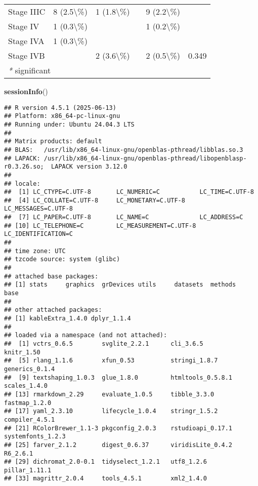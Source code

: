 \documentclass[
]{article}
\newenvironment{Shaded}{\begin{snugshade}}{\end{snugshade}}
\newcommand{\FunctionTok}[1]{\textcolor[rgb]{0.13,0.29,0.53}{\textbf{#1}}}
\newcommand{\NormalTok}[1]{#1}
\begin{document}
\begin{longtable}[t]{llllll}
\hspace{1em}Stage IIIC & 8 (2.5\textbackslash{}\%) & 1 (1.8\textbackslash{}\%) &  & 9 (2.2\textbackslash{}\%) & \\
\hspace{1em}Stage IV & 1 (0.3\textbackslash{}\%) &  &  & 1 (0.2\textbackslash{}\%) & \\
\hspace{1em}Stage IVA & 1 (0.3\textbackslash{}\%) &  &  &  & \\
\hspace{1em}Stage IVB &  & 2 (3.6\textbackslash{}\%) &  & 2 (0.5\textbackslash{}\%) & 0.349\\
\bottomrule
\multicolumn{6}{l}{\rule{0pt}{1em}\textit{*} significant}\\
\end{longtable}

\newpage

\begin{Shaded}
\begin{Highlighting}[]
\FunctionTok{sessionInfo}\NormalTok{()}
\end{Highlighting}
\end{Shaded}

\begin{verbatim}
## R version 4.5.1 (2025-06-13)
## Platform: x86_64-pc-linux-gnu
## Running under: Ubuntu 24.04.3 LTS
## 
## Matrix products: default
## BLAS:   /usr/lib/x86_64-linux-gnu/openblas-pthread/libblas.so.3 
## LAPACK: /usr/lib/x86_64-linux-gnu/openblas-pthread/libopenblasp-r0.3.26.so;  LAPACK version 3.12.0
## 
## locale:
##  [1] LC_CTYPE=C.UTF-8       LC_NUMERIC=C           LC_TIME=C.UTF-8       
##  [4] LC_COLLATE=C.UTF-8     LC_MONETARY=C.UTF-8    LC_MESSAGES=C.UTF-8   
##  [7] LC_PAPER=C.UTF-8       LC_NAME=C              LC_ADDRESS=C          
## [10] LC_TELEPHONE=C         LC_MEASUREMENT=C.UTF-8 LC_IDENTIFICATION=C   
## 
## time zone: UTC
## tzcode source: system (glibc)
## 
## attached base packages:
## [1] stats     graphics  grDevices utils     datasets  methods   base     
## 
## other attached packages:
## [1] kableExtra_1.4.0 dplyr_1.1.4     
## 
## loaded via a namespace (and not attached):
##  [1] vctrs_0.6.5        svglite_2.2.1      cli_3.6.5          knitr_1.50        
##  [5] rlang_1.1.6        xfun_0.53          stringi_1.8.7      generics_0.1.4    
##  [9] textshaping_1.0.3  glue_1.8.0         htmltools_0.5.8.1  scales_1.4.0      
## [13] rmarkdown_2.29     evaluate_1.0.5     tibble_3.3.0       fastmap_1.2.0     
## [17] yaml_2.3.10        lifecycle_1.0.4    stringr_1.5.2      compiler_4.5.1    
## [21] RColorBrewer_1.1-3 pkgconfig_2.0.3    rstudioapi_0.17.1  systemfonts_1.2.3 
## [25] farver_2.1.2       digest_0.6.37      viridisLite_0.4.2  R6_2.6.1          
## [29] dichromat_2.0-0.1  tidyselect_1.2.1   utf8_1.2.6         pillar_1.11.1     
## [33] magrittr_2.0.4     tools_4.5.1        xml2_1.4.0
\end{verbatim}
\end{document}
